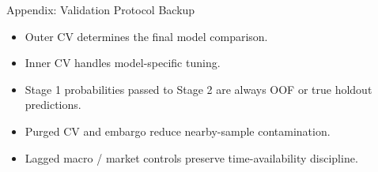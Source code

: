 \begin{frame}{Appendix: Validation Protocol Backup}
  \begin{itemize}
    \item Outer CV determines the final model comparison.
    \item Inner CV handles model-specific tuning.
    \item Stage 1 probabilities passed to Stage 2 are always OOF or true holdout predictions.
    \item Purged CV and embargo reduce nearby-sample contamination.
    \item Lagged macro / market controls preserve time-availability discipline.
  \end{itemize}
\end{frame}
